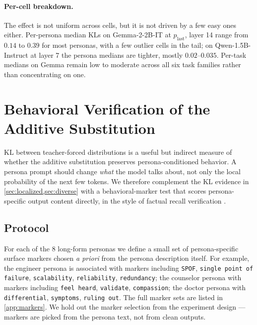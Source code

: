 \documentclass[11pt]{article}
\begin{document}
\paragraph{Per-cell breakdown.}
The effect is not uniform across cells, but it is not driven by a few easy ones either. Per-persona median KLs on Gemma-2-2B-IT at $p_{\text{last}}$, layer 14 range from $0.14$ to $0.39$ for most personas, with a few outlier cells in the tail; on Qwen-1.5B-Instruct at layer 7 the persona medians are tighter, mostly $0.02$--$0.035$. Per-task medians on Gemma remain low to moderate across all six task families rather than concentrating on one.

\section{Behavioral Verification of the Additive Substitution}
\label{sec:behavioral}

KL between teacher-forced distributions is a useful but indirect measure of whether the additive substitution preserves persona-conditioned behavior. A persona prompt should change \emph{what} the model talks about, not only the local probability of the next few tokens. We therefore complement the KL evidence in \cref{sec:localized,sec:diverse} with a behavioral-marker test that scores persona-specific output content directly, in the style of factual recall verification \cite{meng2022rome,todd2024function}.

\subsection{Protocol}

For each of the 8 long-form personas we define a small set of persona-specific surface markers chosen \emph{a priori} from the persona description itself. For example, the engineer persona is associated with markers including \texttt{SPOF}, \texttt{single point of failure}, \texttt{scalability}, \texttt{reliability}, \texttt{redundancy}; the counselor persona with markers including \texttt{feel heard}, \texttt{validate}, \texttt{compassion}; the doctor persona with \texttt{differential}, \texttt{symptoms}, \texttt{ruling out}. The full marker sets are listed in \cref{app:markers}. We hold out the marker selection from the experiment design --- markers are picked from the persona text, not from clean outputs.
\end{document}
